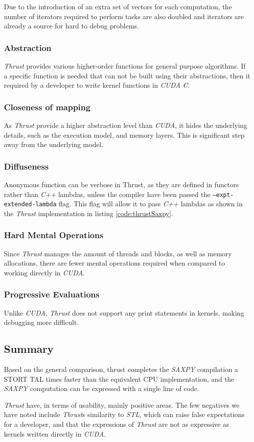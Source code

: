 Due to the introduction of an extra set of vectors for each computation, the number of iterators required to perform tasks are also doubled and iterators are already a source for hard to debug problems.

\subsubsection[*]{Abstraction}
\textit{Thrust} provides various higher-order functions for general purpose algorithms. If a specific function is needed that can not be built using their abstractions, then it required by a developer to write kernel functions in \textit{CUDA C}. 

\subsubsection[*]{Closeness of mapping}
As \textit{Thrust} provide a higher abstraction level than \textit{CUDA}, it hides the underlying details, such as the execution model, and memory layers. This is significant step away from the underlying model.

\subsubsection[*]{Diffuseness}
Anonymous function can be verbose in Thrust, as they are defined in functors rather than \textit{C++} lambdas, unless the compiler have been passed the \texttt{--expt-extended-lambda} flag. This flag will allow it to pass \textit{C++} lambdas as shown in the \textit{Thrust} implementation in listing \ref{code:thrustSaxpy}.

\subsubsection[*]{Hard Mental Operations}
Since \textit{Thrust} manages the amount of threads and blocks, as well as memory allocations, there are fewer mental operations required when compared to working directly in \textit{CUDA}. 

\subsubsection[*]{Progressive Evaluations}
Unlike \textit{CUDA}, \textit{Thrust} does not support any print statements in kernels, making debugging more difficult. 

\subsection{Summary}\label{sec:thrustEvelSum}
Based on the general comparison, thrust completes the \textit{SAXPY} compilation a STORT TAL times faster than the equivalent CPU implementation, and the \textit{SAXPY} computation can be expressed with a single line of code.

\textit{Thrust} have, in terms of usability, mainly positive areas. The few negatives we have noted include \textit{Thrust}s similarity to \textit{STL}, which can raise false expectations for a developer, and that the expressions of \textit{Thrust} are not as expressive as kernels written directly in \textit{CUDA}. 
